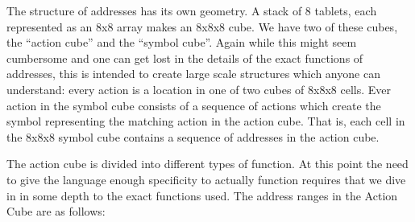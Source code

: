 \documentclass[12pt,a4paper]{amsart}
\numberwithin{equation}{section}
\begin{document}
The structure of addresses has its own geometry. A stack of 8 tablets,
each represented as an 8x8 array makes an 8x8x8 cube. We have two of
these cubes, the ``action cube'' and the ``symbol cube''. Again while
this might seem cumbersome and one can get lost in the details of the
exact functions of addresses, this is intended to create large scale
structures which anyone can understand: every action is a location in
one of two cubes of 8x8x8 cells. Ever action in the symbol cube consists
of a sequence of actions which create the symbol representing the
matching action in the action cube. That is, each cell in the 8x8x8
symbol cube contains a sequence of addresses in the action cube.

The action cube is divided into different types of function. At this
point the need to give the language enough specificity to actually
function requires that we dive in in some depth to the exact functions
used. The address ranges in the Action Cube are as follows:
\end{document}
